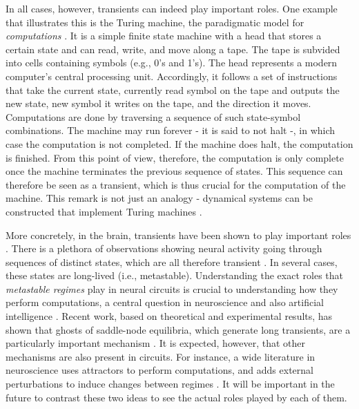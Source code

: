 In all cases, however, transients can indeed play important roles. One example that illustrates this is the Turing machine, the paradigmatic model for \textit{computations} \cite{turing1936on, computabilitybook}. It is a simple finite state machine with a head that stores a certain state and can read, write, and move along a tape. The tape is subvided into cells containing symbols (e.g., 0's and 1's). The head represents a modern computer's central processing unit. Accordingly, it follows a set of instructions that take the current state, currently read symbol on the tape and outputs the new state, new symbol it writes on the tape, and the direction it moves. Computations are done by traversing a sequence of such state-symbol combinations. The machine may run forever - it is said to not halt -, in which case the computation is not completed. If the machine does halt, the computation is finished. From this point of view, therefore, the computation is only complete once the machine terminates the previous sequence of states. This sequence can therefore be seen as a transient, which is thus crucial for the computation of the machine. This remark is not just an analogy - dynamical systems can be constructed that implement Turing machines \cite{postlethwaite2024a}.

More concretely, in the brain, transients have been shown to play important roles \cite{ashwin2005when, mazor2005transient}. There is a plethora of observations showing neural activity going through sequences of distinct states, which are all therefore transient \cite{tognoli2014metastable, brinkman2022metastable}. In several cases, these states are long-lived (i.e., metastable). Understanding the exact roles that \textit{metastable regimes} play in neural circuits is crucial to understanding how they perform computations, a central question in neuroscience and also artificial intelligence \cite{koch2024biological, vyas2020computation, sussillo2013opening}. Recent work, based on theoretical and experimental results, has shown that ghosts of saddle-node equilibria, which generate long transients, are a particularly important mechanism \cite{koch2024biological, koch2024ghost, nandan2022cells, mazor2005transient}. It is expected, however, that other mechanisms are also present in circuits. For instance, a wide literature in neuroscience uses attractors to perform computations, and adds external perturbations to induce changes between regimes \cite{driscoll2024flexible, sussillo2013opening, brinkman2022metastable, laje2013robust}. It will be important in the future to contrast these two ideas to see the actual roles played by each of them.

